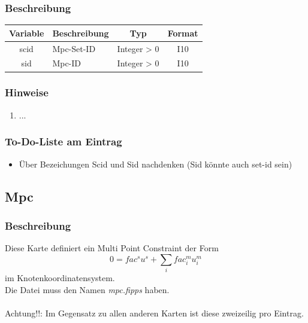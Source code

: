 \documentclass[11pt,titlepage,listof=totoc,bibliography=totoc,twoside]{scrreprt}
\begin{document}
{{\subsubsection{Beschreibung}

\begin{tabularx}{\textwidth}{cXcc}
\toprule
Variable& Beschreibung		& Typ		& Format\\
\midrule
scid	& Mpc-Set-ID		& Integer > 0	& I10	\\
sid	& Mpc-ID		& Integer > 0	& I10	\\
\bottomrule
\end{tabularx}

\subsubsection{Hinweise}

\begin{enumerate}
\item ...
\end{enumerate}

\subsubsection{To-Do-Liste am Eintrag}

\begin{itemize}
\item Über Bezeichungen Scid und Sid nachdenken (Sid könnte auch set-id sein)
\end{itemize}

\newpage

\subsection{Mpc}

\subsubsection{Beschreibung}

Diese Karte definiert ein Multi Point Constraint der Form\\
\begin{equation}
 0 = fac^s u^s + \sum_i fac^m_i u^m_i
\end{equation}
im Knotenkoordinatensystem.\\
Die Datei muss den Namen \emph{mpc.fipps} haben. \\
\\
Achtung!!: Im Gegensatz zu allen anderen Karten ist diese zweizeilig pro Eintrag.

}}
\end{document}
